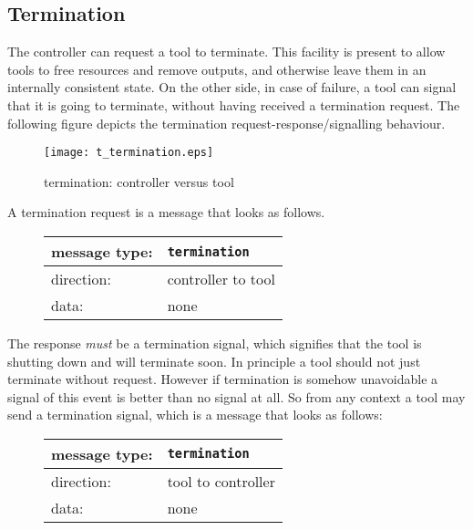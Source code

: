 \documentclass{article}
\newcommand{\msg}[1]{\texttt{#1}}
\begin{document}
  \subsection{Termination}

   The controller can request a tool to terminate. This facility is present to
   allow tools to free resources and remove outputs, and otherwise leave them
   in an internally consistent state. On the other side, in case of failure, a
   tool can signal that it is going to terminate, without having received a
   termination request. The following figure depicts the termination
   request-response/signalling behaviour.

   \begin{figure}[H]
    \begin{center}
     \texttt{[image: t\_termination.eps]}
    \end{center}
    \vspace{-0.3cm}
    \caption{termination: controller versus tool}
   \end{figure}

   \noindent A termination request is a message that looks as follows.

   \begin{figure}[H]
    \begin{center}
     \begin{tabular}{|ll|}
      \hline
       message type:    & \msg{termination} \\
      \hline
       direction:       & controller to tool \\
       data:            & none \\
      \hline
     \end{tabular}
    \end{center}
   \end{figure}
   \vspace{-0.4cm}

   \noindent The response \emph{must} be a termination signal, which signifies
   that the tool is shutting down and will terminate soon.  In principle a tool
   should not just terminate without request. However if termination is somehow
   unavoidable a signal of this event is better than no signal at all.  So from
   any context a tool may send a termination signal, which is a message that
   looks as follows:

   \begin{figure}[H]
    \begin{center}
     \begin{tabular}{|ll|}
      \hline
       message type:   & \msg{termination} \\
      \hline
       direction:      & tool to controller \\
       data:           & none \\
      \hline
     \end{tabular}
    \end{center}
   \end{figure}
   \vspace{-0.4cm}
\end{document}

